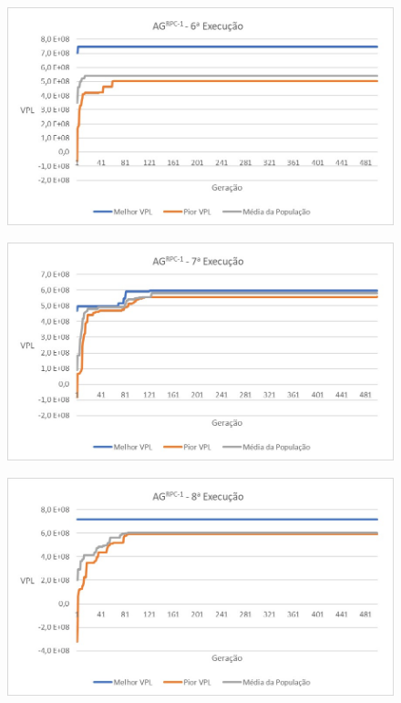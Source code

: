 \documentclass[12pt,a4paper]{report}
\begin{document}
\begin{figure}[H]
\centering

\includegraphics[scale=1]{AGRPC/6}
\end{figure}

\begin{figure}[H]
\centering

\includegraphics[scale=1]{AGRPC/7}
\end{figure}

\begin{figure}[H]
\centering

\includegraphics[scale=1]{AGRPC/8}
\end{figure}
\end{document}
